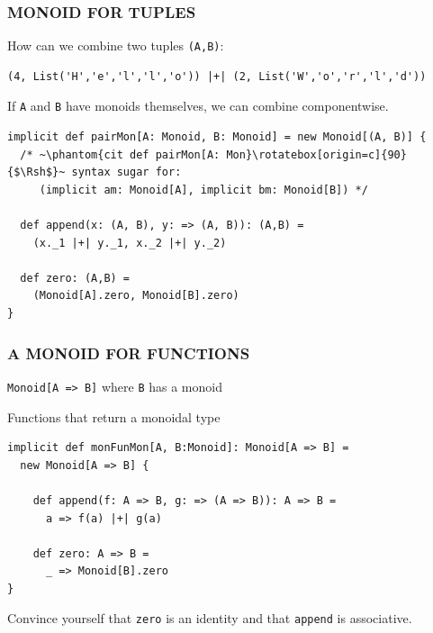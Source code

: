 \documentclass{beamer}
\begin{document}
\begin{frame}[fragile]\frametitle{MONOID FOR TUPLES}
  How can we combine two tuples \texttt{(A,B)}:

  \begin{block}{}
  \begin{lstlisting}
(4, List('H','e','l','l','o')) |+| (2, List('W','o','r','l','d'))
  \end{lstlisting}
  \end{block}

  \pause

  If \texttt{A} and \texttt{B} have monoids themselves, we can \alert{combine componentwise}.

  \begin{block}{}
  \begin{lstlisting}
implicit def pairMon[A: Monoid, B: Monoid] = new Monoid[(A, B)] {
  /* ~\phantom{cit def pairMon[A: Mon}\rotatebox[origin=c]{90}{$\Rsh$}~ syntax sugar for:
     (implicit am: Monoid[A], implicit bm: Monoid[B]) */

  def append(x: (A, B), y: => (A, B)): (A,B) =
    (x._1 |+| y._1, x._2 |+| y._2)

  def zero: (A,B) =
    (Monoid[A].zero, Monoid[B].zero)
}
  \end{lstlisting}
  \end{block}
\end{frame}


\begin{frame}[fragile] \frametitle{A MONOID FOR FUNCTIONS}
  \texttt{Monoid[A => B]} \pause where \alert{\texttt{B} has a monoid}

  \begin{block}{Functions that return a monoidal type}
  \begin{lstlisting}
implicit def monFunMon[A, B:Monoid]: Monoid[A => B] =
  new Monoid[A => B] {

    def append(f: A => B, g: => (A => B)): A => B =
      a => f(a) |+| g(a)

    def zero: A => B =
      _ => Monoid[B].zero
}
  \end{lstlisting}
  \end{block}
  Convince yourself that \texttt{zero} is an identity and that \texttt{append} is associative.
\end{frame}
\end{document}

